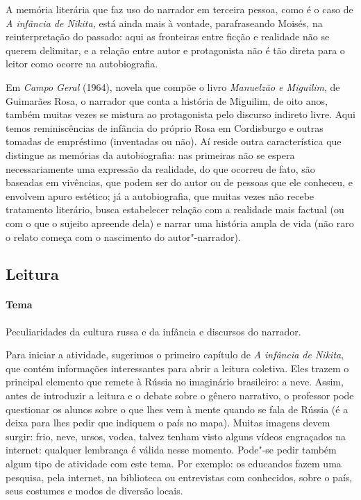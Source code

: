 \documentclass[11pt]{extarticle}
\begin{document}
A memória literária que faz uso do narrador em terceira pessoa, como é o
caso de \emph{A infância de Nikita,} está ainda mais à vontade,
parafraseando Moisés, na reinterpretação do passado: aqui as fronteiras
entre ficção e realidade não se querem delimitar, e a relação entre
autor e protagonista não é tão direta para o leitor como ocorre na
autobiografia.

Em \emph{Campo Geral} (1964), novela que compõe o livro \emph{Manuelzão
e Miguilim}, de Guimarães Rosa, o narrador que conta a história de
Miguilim, de oito anos, também muitas vezes se mistura ao protagonista
pelo discurso indireto livre. Aqui temos reminiscências de infância do
próprio Rosa em Cordisburgo e outras tomadas de empréstimo (inventadas
ou não). Aí reside outra característica que distingue as memórias da
autobiografia: nas primeiras não se espera necessariamente uma expressão
da realidade, do que ocorreu de fato, são baseadas em vivências, que
podem ser do autor ou de pessoas que ele conheceu, e envolvem apuro
estético; já a autobiografia, que muitas vezes não recebe tratamento
literário, busca estabelecer relação com a realidade mais factual (ou
com o que o sujeito apreende dela) e narrar uma história ampla de vida
(não raro o relato começa com o nascimento do autor"-narrador).


\subsection{Leitura}

\paragraph{Tema} Peculiaridades da cultura russa e da infância e
discursos do narrador.

Para iniciar a atividade, sugerimos o primeiro capítulo de \emph{A
infância de Nikita}, que contém informações interessantes para abrir a
leitura coletiva. Eles trazem o principal elemento que remete à Rússia
no imaginário brasileiro: a neve. Assim, antes de introduzir a leitura e
o debate sobre o gênero narrativo, o professor pode questionar os alunos
sobre o que lhes vem à mente quando se fala de Rússia (é a deixa para
lhes pedir que indiquem o país no mapa). Muitas imagens devem surgir:
frio, neve, ursos, vodca, talvez tenham visto alguns vídeos engraçados
na internet: qualquer lembrança é válida nesse momento. Pode"-se pedir
também algum tipo de atividade com este tema. Por exemplo: os educandos
fazem uma pesquisa, pela internet, na biblioteca ou entrevistas com
conhecidos, sobre o país, seus costumes e modos de diversão locais.
\end{document}
